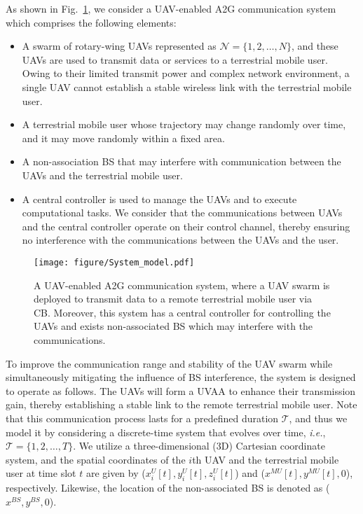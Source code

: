 \documentclass[10pt,journal,compsoc]{IEEEtran}
\begin{document}
\par As shown in Fig.~\ref{fig.Sketch map}, we consider a UAV-enabled A2G communication system which comprises the following elements:

\begin{itemize}

    \item A swarm of rotary-wing UAVs represented as $\mathcal{N} = \{1, 2, \ldots, N\}$, and these UAVs are used to transmit data or services to a terrestrial mobile user. Owing to their limited transmit power and complex network environment, a single UAV cannot establish a stable wireless link with the terrestrial mobile user.

    \item A terrestrial mobile user whose trajectory may change randomly over time, and it may move randomly within a fixed area.

    \item A non-association BS that may interfere with communication between the UAVs and the terrestrial mobile user. 

    \item A central controller is used to manage the UAVs and to execute computational tasks. We consider that the communications between UAVs and the central controller operate on their control channel, thereby ensuring no interference with the communications between the UAVs and the user.

\end{itemize}

\begin{figure}[t]
	\centerline{\texttt{[image: figure/System\_model.pdf]}}
	\caption{A UAV-enabled A2G communication system, where a UAV swarm is deployed to transmit data to a remote terrestrial mobile user via CB. Moreover, this system has a central controller for controlling the UAVs and exists non-associated BS which may interfere with the communications.} 
	\label{fig.Sketch map}
\end{figure}

\par To improve the communication range and stability of the UAV swarm while simultaneously mitigating the influence of BS interference, the system is designed to operate as follows. The UAVs will form a UVAA to enhance their transmission gain, thereby establishing a stable link to the remote terrestrial mobile user. Note that this communication process lasts for a predefined duration $\mathcal{T}$, and thus we model it by considering a discrete-time system that evolves over time, \emph{i.e.}, $\mathcal{T} = \{1, 2, \ldots, T\}$. We utilize a three-dimensional (3D) Cartesian coordinate system, and the spatial coordinates of the $i$th UAV and the terrestrial mobile user at time slot $t$ are given by ($x_{i}^U[t], y_{i}^U[t], z_{i}^U[t]$) and ($x^{MU}[t], y^{MU}[t], 0$), respectively. Likewise, the location of the non-associated BS is denoted as ($x^{BS}, y^{BS}, 0$).
\end{document}
